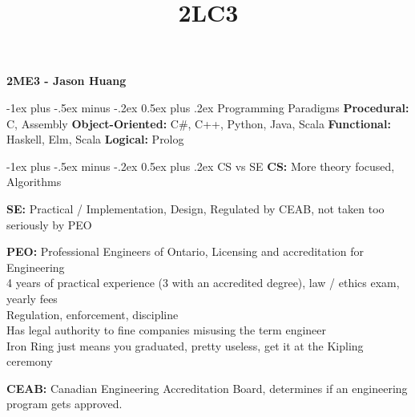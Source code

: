 \documentclass[letterpaper, 8pt]{extarticle}
\title{2LC3}
\makeatletter
\renewcommand{\section}{\@startsection{section}{1}{0mm}%
                                {-1ex plus -.5ex minus -.2ex}%
                                {0.5ex plus .2ex}%
                                {\normalfont\normalsize\bfseries}}
\makeatother
\begin{document}
\raggedright
\tiny

\begin{center}
    {\textbf{2ME3 - Jason Huang}} \\
\end{center}
\begin{multicols*}{6}
    \setlength{\premulticols}{1pt}
    \setlength{\postmulticols}{1pt}
    \setlength{\multicolsep}{1pt}
    \setlength{\columnsep}{2pt}

    \section{Programming Paradigms}
    \textbf{Procedural:} C, Assembly
    \textbf{Object-Oriented:} C\#, C++, Python, Java, Scala
    \textbf{Functional:} Haskell, Elm, Scala
    \textbf{Logical:} Prolog

    \section{CS vs SE}
    \textbf{CS:} More theory focused, Algorithms

    \textbf{SE:} Practical / Implementation, Design,
    Regulated by CEAB, not taken too seriously by PEO

    \textbf{PEO:} Professional Engineers of Ontario, Licensing and accreditation for Engineering \\
    4 years of practical experience (3 with an accredited degree), law / ethics exam, yearly fees \\
    Regulation, enforcement, discipline \\
    Has legal authority to fine companies misusing the term engineer \\
    Iron Ring just means you graduated, pretty useless, get it at the Kipling ceremony

    \textbf{CEAB:} Canadian Engineering Accreditation Board,
    determines if an engineering program gets approved.


\end{multicols*}
\end{document}
